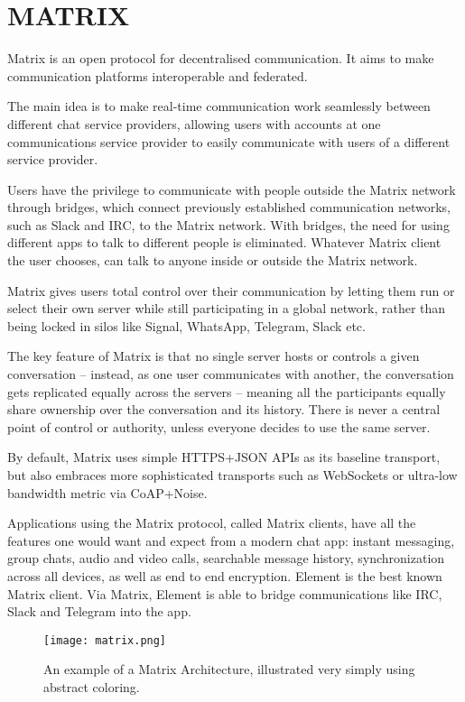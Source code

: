 \section{MATRIX}

Matrix is an open protocol for decentralised communication. It aims to make 
communication platforms interoperable and federated.

The main idea is to make real-time communication work seamlessly between different chat 
service providers, allowing users with accounts at one communications service provider to 
easily communicate with users of a different service provider.

Users have the privilege to communicate with people outside the Matrix network through bridges, 
which connect previously established communication networks, such as Slack and IRC, to the Matrix network.
With bridges, the need for using different apps to talk to different people is eliminated. Whatever Matrix 
client the user chooses, can talk to anyone inside or outside the Matrix network.

Matrix gives users total control over their communication by letting them run or select their own 
server while still participating in a global network, rather than being locked in silos 
like Signal, WhatsApp, Telegram, Slack etc. 

The key feature of Matrix is that no single server hosts or controls a given conversation -- instead, 
as one user communicates with another, the conversation gets replicated equally across the servers -- meaning 
all the participants equally share ownership over the conversation and its history. 
There is never a central point of control or authority, 
unless everyone decides to use the same server.~\cite{MATRIXorgOpenProtocol}

By default, Matrix uses simple HTTPS+JSON APIs as its baseline transport, but also embraces 
more sophisticated transports such as WebSockets or ultra-low bandwidth metric via CoAP+Noise.~\cite{MATRIX}

Applications using the Matrix protocol, called Matrix clients, have all the features one would
want and expect from a modern chat app: instant messaging, group chats, audio and video calls, 
searchable message history, synchronization across all devices, as well as end to end encryption.
Element is the best known Matrix client.
Via Matrix, Element is able to bridge communications like IRC, Slack and Telegram into the app.~\cite{RumaMATRIX}

\begin{figure}[h]
    \begin{center}
        \texttt{[image: matrix.png]}
    \end{center}
    \caption{An example of a Matrix Architecture, illustrated very simply using abstract coloring.}
    \label{fig:matrix}
\end{figure}

